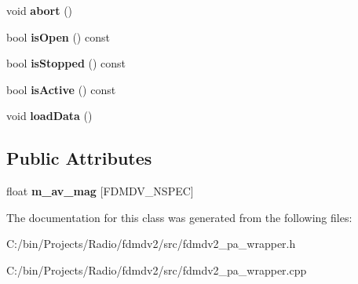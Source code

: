 \begin{DoxyCompactItemize}
\item 
\hypertarget{class_port_audio_wrap_a22409ee2e9d87fbab60ef71288620c34}{void {\bfseries abort} ()}\label{class_port_audio_wrap_a22409ee2e9d87fbab60ef71288620c34}

\item 
\hypertarget{class_port_audio_wrap_ad4a72bbe2ec6190336c2412df076c3f7}{bool {\bfseries is\-Open} () const }\label{class_port_audio_wrap_ad4a72bbe2ec6190336c2412df076c3f7}

\item 
\hypertarget{class_port_audio_wrap_ae0bac2f93270a323c9ead4dbf61eda1d}{bool {\bfseries is\-Stopped} () const }\label{class_port_audio_wrap_ae0bac2f93270a323c9ead4dbf61eda1d}

\item 
\hypertarget{class_port_audio_wrap_ae89ba28aeb62269ae28be8908294bb1c}{bool {\bfseries is\-Active} () const }\label{class_port_audio_wrap_ae89ba28aeb62269ae28be8908294bb1c}

\item 
\hypertarget{class_port_audio_wrap_aa5776602a5e021fe3c83c1cdf36340d1}{void {\bfseries load\-Data} ()}\label{class_port_audio_wrap_aa5776602a5e021fe3c83c1cdf36340d1}

\end{DoxyCompactItemize}
\subsection*{Public Attributes}
\begin{DoxyCompactItemize}
\item 
\hypertarget{class_port_audio_wrap_ad9da60946a4fec855cce07c1e497d7be}{float {\bfseries m\-\_\-av\-\_\-mag} \mbox{[}F\-D\-M\-D\-V\-\_\-\-N\-S\-P\-E\-C\mbox{]}}\label{class_port_audio_wrap_ad9da60946a4fec855cce07c1e497d7be}

\end{DoxyCompactItemize}


The documentation for this class was generated from the following files\-:\begin{DoxyCompactItemize}
\item 
C\-:/bin/\-Projects/\-Radio/fdmdv2/src/fdmdv2\-\_\-pa\-\_\-wrapper.\-h\item 
C\-:/bin/\-Projects/\-Radio/fdmdv2/src/fdmdv2\-\_\-pa\-\_\-wrapper.\-cpp\end{DoxyCompactItemize}
